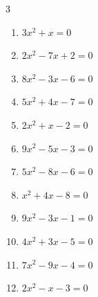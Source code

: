 \begin{multicols}{3}
\begin{enumerate}

  \item $3x^{2}+x=0$


  \item $2x^{2}-7x+2=0$


  \item $8x^{2}-3x-6=0$


  \item $5x^{2}+4x-7=0$


\columnbreak %

  \item $2x^{2}+x-2=0$


  \item $9x^{2}-5x-3=0$


  \item $5x^{2}-8x-6=0$


  \item $x^{2}+4x-8=0$


  \item $9x^{2}-3x-1=0$


  \item $4x^{2}+3x-5=0$


  \item $7x^{2}-9x-4=0$


\columnbreak %

  \item $2x^{2}-x-3=0$



\end{enumerate}
\end{multicols}
